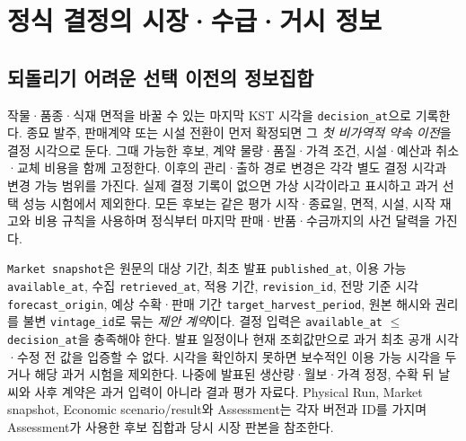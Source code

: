 \documentclass[11pt,a4paper]{article}
\begin{document}
\section{정식 결정의 시장·수급·거시 정보}
\subsection{되돌리기 어려운 선택 이전의 정보집합}
작물·품종·식재 면적을 바꿀 수 있는 마지막 KST 시각을 \texttt{decision\_at}으로 기록한다. 종묘 발주, 판매계약 또는 시설 전환이 먼저 확정되면 그 \emph{첫 비가역적 약속 이전}을 결정 시각으로 둔다. 그때 가능한 후보, 계약 물량·품질·가격 조건, 시설·예산과 취소·교체 비용을 함께 고정한다. 이후의 관리·출하 경로 변경은 각각 별도 결정 시각과 변경 가능 범위를 가진다. 실제 결정 기록이 없으면 가상 시각이라고 표시하고 과거 선택 성능 시험에서 제외한다. 모든 후보는 같은 평가 시작·종료일, 면적, 시설, 시작 재고와 비용 규칙을 사용하며 정식부터 마지막 판매·반품·수금까지의 사건 달력을 가진다.

\texttt{Market snapshot}은 원문의 대상 기간, 최초 발표 \texttt{published\_at}, 이용 가능 \texttt{available\_at}, 수집 \texttt{retrieved\_at}, 적용 기간, \texttt{revision\_id}, 전망 기준 시각 \texttt{forecast\_origin}, 예상 수확·판매 기간 \texttt{target\_harvest\_period}, 원본 해시와 권리를 불변 \texttt{vintage\_id}로 묶는 \emph{제안 계약}이다. 결정 입력은 \texttt{available\_at} $\leq$ \texttt{decision\_at}을 충족해야 한다. 발표 일정이나 현재 조회값만으로 과거 최초 공개 시각·수정 전 값을 입증할 수 없다. 시각을 확인하지 못하면 보수적인 이용 가능 시각을 두거나 해당 과거 시험을 제외한다. 나중에 발표된 생산량·월보·가격 정정, 수확 뒤 날씨와 사후 계약은 과거 입력이 아니라 결과 평가 자료다. Physical Run, Market snapshot, Economic scenario/result와 Assessment는 각자 버전과 ID를 가지며 Assessment가 사용한 후보 집합과 당시 시장 판본을 참조한다.
\end{document}
